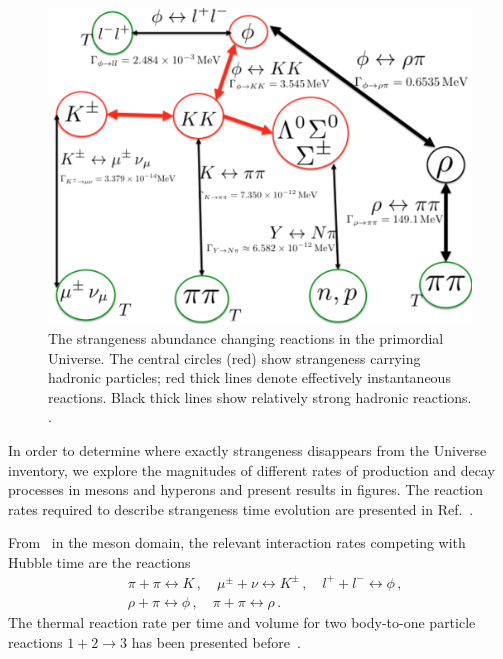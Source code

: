 \begin{figure} 
\centerline{\includegraphics[width=0.85\linewidth]{./plots/Strangeness002_newJ.jpg}}
\caption{The strangeness abundance changing reactions in the primordial Universe. The central circles (red) show strangeness carrying hadronic particles; red thick lines denote effectively instantaneous reactions. Black thick lines show relatively strong hadronic reactions. . }
\label{Strangeness_map2} 
\end{figure}

In order to determine where exactly strangeness disappears from the Universe inventory, we explore the magnitudes of different rates of production and decay processes in mesons and hyperons and present results in figures. The reaction rates required to describe strangeness time evolution are presented in Ref.~\cite{Rafelski:2020ajx}. 
 
From~ in the meson domain, the relevant interaction rates competing with Hubble time are the reactions
\begin{align}
 &\pi+\pi\leftrightarrow K\,,\quad\mu^\pm+\nu\leftrightarrow K^\pm\,,\quad l^++l^-\leftrightarrow\phi\,,\\
 &\rho+\pi\leftrightarrow\phi\,,\quad \pi+\pi\leftrightarrow\rho\,.
\end{align}
The thermal reaction rate per time and volume for two body-to-one particle reactions $1+2\rightarrow 3$ has been presented before~\cite{Koch:1986ud,Kuznetsova:2008jt,Kuznetsova:2010pi}. 

